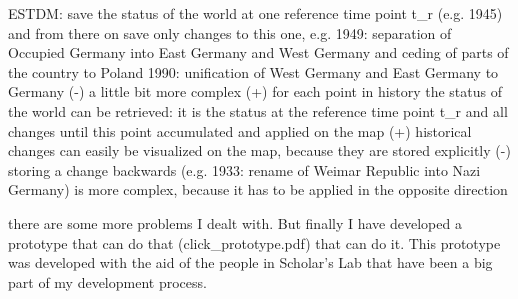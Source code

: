 ESTDM: save the status of the world at one reference time point t\_r (e.g. 1945) and from there on save only changes to this one, e.g.
1949: separation of Occupied Germany into East Germany and West Germany and ceding of parts of the country to Poland
1990: unification of West Germany and East Germany to Germany
(-) a little bit more complex
(+) for each point in history the status of the world can be retrieved: it is the status at the reference time point t\_r and all changes until this point accumulated and applied on the map
(+) historical changes can easily be visualized on the map, because they are stored explicitly
(-) storing a change backwards (e.g. 1933: rename of Weimar Republic into Nazi Germany) is more complex, because it has to be applied in the opposite direction

there are some more problems I dealt with. But finally I have developed a prototype that can do that (click\_prototype.pdf) that can do it. This prototype was developed with the aid of the people in Scholar's Lab that have been a big part of my development process.

